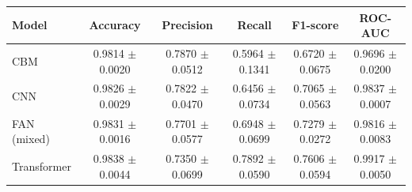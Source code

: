 \begin{tabular}{lccccc}
\toprule
Model & Accuracy & Precision & Recall & F1-score & ROC-AUC \\
\midrule
CBM & 0.9814 $\pm$ 0.0020 & 0.7870 $\pm$ 0.0512 & 0.5964 $\pm$ 0.1341 & 0.6720 $\pm$ 0.0675 & 0.9696 $\pm$ 0.0200 \\
CNN & 0.9826 $\pm$ 0.0029 & 0.7822 $\pm$ 0.0470 & 0.6456 $\pm$ 0.0734 & 0.7065 $\pm$ 0.0563 & 0.9837 $\pm$ 0.0007 \\
FAN (mixed) & 0.9831 $\pm$ 0.0016 & 0.7701 $\pm$ 0.0577 & 0.6948 $\pm$ 0.0699 & 0.7279 $\pm$ 0.0272 & 0.9816 $\pm$ 0.0083 \\
Transformer & 0.9838 $\pm$ 0.0044 & 0.7350 $\pm$ 0.0699 & 0.7892 $\pm$ 0.0590 & 0.7606 $\pm$ 0.0594 & 0.9917 $\pm$ 0.0050 \\
\bottomrule
\end{tabular}
